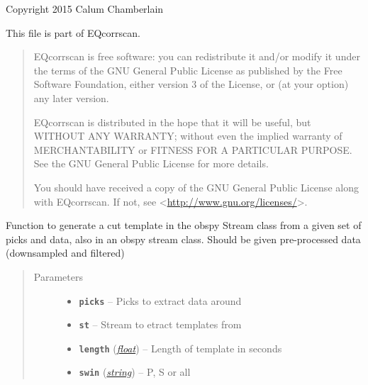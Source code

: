 \documentclass[a4paper,10pt,english]{sphinxmanual}
\begin{document}
Copyright 2015 Calum Chamberlain

This file is part of EQcorrscan.
\begin{quote}

EQcorrscan is free software: you can redistribute it and/or modify
it under the terms of the GNU General Public License as published by
the Free Software Foundation, either version 3 of the License, or
(at your option) any later version.

EQcorrscan is distributed in the hope that it will be useful,
but WITHOUT ANY WARRANTY; without even the implied warranty of
MERCHANTABILITY or FITNESS FOR A PARTICULAR PURPOSE.  See the
GNU General Public License for more details.

You should have received a copy of the GNU General Public License
along with EQcorrscan.  If not, see \textless{}\href{http://www.gnu.org/licenses/}{http://www.gnu.org/licenses/}\textgreater{}.
\end{quote}

\begin{fulllineitems}
\label{core:template_gen._template_gen}
Function to generate a cut template in the obspy
Stream class from a given set of picks and data, also in an obspy stream
class.  Should be given pre-processed data (downsampled and filtered)
\begin{quote}\begin{description}
\item[{Parameters}] \leavevmode\begin{itemize}
\item {} 
\textbf{\texttt{picks}} -- Picks to extract data around

\item {} 
\textbf{\texttt{st}} -- Stream to etract templates from

\item {} 
\textbf{\texttt{length}} (\href{https://docs.python.org/library/functions.html\#float}{\emph{float}}) -- Length of template in seconds

\item {} 
\textbf{\texttt{swin}} (\href{https://docs.python.org/library/string.html\#module-string}{\emph{string}}) -- P, S or all

\end{itemize}

\end{description}\end{quote}

\end{fulllineitems}
\end{document}
